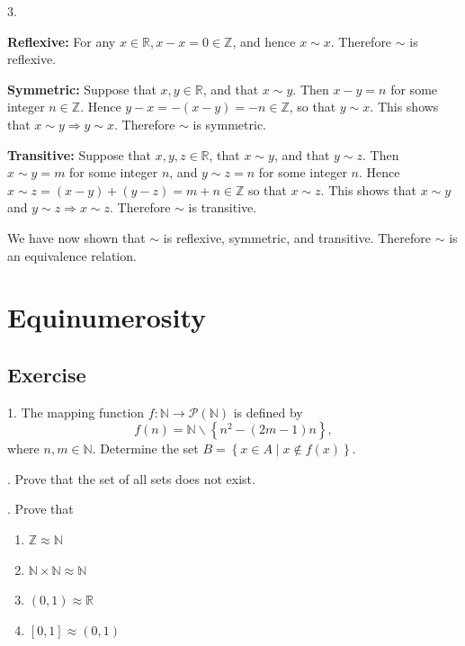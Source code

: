 \documentclass[12pt]{article}
\begin{document}
3. 
\par \textbf{Ref\mbox{l}exive:} For any $x \in \mathbb{R}, x - x = 0 \in \mathbb{Z}$, and hence $x \sim x$. Therefore $\sim$ is reflexive.
\par \textbf{Symmetric:} Suppose that $x, y \in \mathbb{R}$, and that $x \sim y$. Then $x - y = n$ for some integer $n \in \mathbb{Z}$. Hence $y - x = -(x - y) = -n \in \mathbb{Z}$, so that $y \sim x$. This shows that $x \sim y \Rightarrow y \sim x$. Therefore $\sim$ is symmetric.
\par \textbf{Transitive:} Suppose that $x, y, z \in \mathbb{R}$, that $x \sim y$, and that $y \sim z$. Then $x \sim y = m$ for some integer $n$, and $y \sim z = n$ for some integer $n$. Hence $x \sim z = (x - y) + (y - z) = m + n \in \mathbb{Z}$ so that $x \sim z$. This shows that $x \sim y$ and $y \sim z \Rightarrow x \sim z$. Therefore $\sim$ is transitive.
\par We have now shown that $\sim$ is reflexive, symmetric, and transitive. Therefore $\sim$ is an equivalence relation.

\section{Equinumerosity}
\subsection{Exercise}
	1. The mapping function $f:\mathbb{N} \to \mathcal{P}\left( \mathbb{N} \right)$ is defined by 
		\begin{equation*}
		f\left( n \right) = \mathbb{N}\backslash \left\{ {{n^2} - \left( {2m - 1} \right)n} \right\},
		\end{equation*}
	where $n,m \in \mathbb{N}$. Determine the set $B = \left\{ {x \in A \mid x \not\in f\left( x \right)} \right\}.$
	\par {}. Prove that the set of all sets does not exist.
	\par {}.  Prove that 
	\begin{enumerate}
		\item $\mathbb{Z} \approx \mathbb{N}$
		\item $\mathbb{N} \times \mathbb{N} \approx \mathbb{N}$
		\item $(0,1) \approx \mathbb{R}$
		\item $[0,1] \approx(0,1)$
	\end{enumerate}
\end{document}
